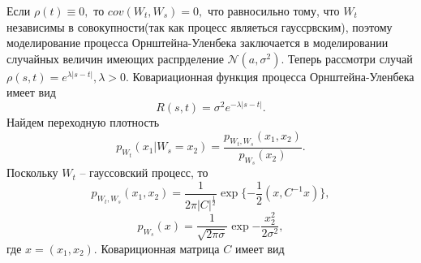 \documentclass[11pt]{article}
\numberwithin{equation}{section}
\begin{document}
Если $\rho(t) \equiv 0,$ то $cov(W_t, W_s) =0,$ что равносильно тому, что $W_t$ независимы в совокупности(так как процесс являеться гауссрвским),
поэтому моделирование процесса Орнштейна-Уленбека заключается в моделировании случайных величин имеющих распрделение $\mathcal{N}(a,\sigma^2).$
Теперь рассмотри случай $\rho(s,t) = e^{\lambda |s-t|}, \lambda >0.$
Ковариационная функция процесса Орнштейна-Уленбека имеет вид
$$ R(s,t) = \sigma^2 e^{-\lambda |s-t|}.$$
Найдем переходную плотность 
$$ p_{W_t}(x_1|W_s= x_2) = \frac{p_{W_t,W_s}(x_1,x_2)}{p_{W_s}(x_2)}.$$
Поскольку $W_t$ -- гауссовский процесс, то 
$$p_{W_t, W_s}(x_1, x_2) = \frac{1}{2\pi |C|^{\frac{1}{2}}} \exp \{ -\frac{1}{2} (x, C^{-1}x) \},$$
$$ p_{W_s}(x) = \frac{1}{\sqrt{2\pi \sigma}} \exp{-\frac{x_2^2}{2\sigma^2}},$$
где $x = (x_1,x_2).$ Ковариционная матрица $C$ имеет вид
\end{document}
